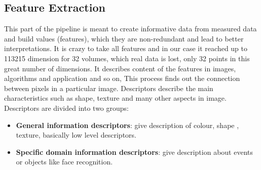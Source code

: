 \subsection{Feature Extraction}

This part of the pipeline is meant to create informative data from measured data and build values (features), which they are non-redundant and lead to better interpretations.
It is crazy to take all features and in our case it reached up to 113215 dimension for 32 volumes, which real data is lost, only 32 points in this great number of dimensions.
It describes content of the features in images, algorithms and application and so on, 
This process finds out the connection between pixels in a particular image.
Descriptors describe the main characteristics such as shape, texture and many other aspects in image.
Descriptors are  divided into two groups:
\begin{itemize}
\item \textbf{General information descriptors}: give description of colour, shape , texture, basically low level descriptors.
\item \textbf{Specific domain information descriptors}: give description about events or objects like face recognition.
\end{itemize}


